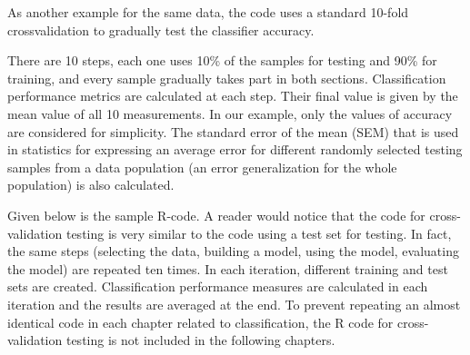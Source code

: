 As another example for the same data, the code uses a standard 10-fold crossvalidation to gradually test the classifier accuracy.

There are 10 steps, each one uses 10\% of the samples for testing and 90\% for
training, and every sample gradually takes part in both sections. Classification
performance metrics are calculated at each step. Their final value is given by the
mean value of all 10 measurements. In our example, only the values of accuracy
are considered for simplicity. The standard error of the mean (SEM) that is used
in statistics for expressing an average error for different randomly selected testing
samples from a data population (an error generalization for the whole population)
is also calculated.

Given below is the sample R-code. A reader would notice that the code for
cross-validation testing is very similar to the code using a test set for testing. In fact, the same steps (selecting the data, building a model, using the model,
evaluating the model) are repeated ten times. In each iteration, different training
and test sets are created. Classification performance measures are calculated in
each iteration and the results are averaged at the end. To prevent repeating an
almost identical code in each chapter related to classification, the R code for
cross-validation testing is not included in the following chapters.

